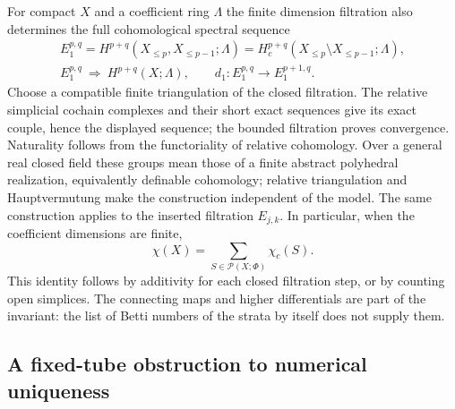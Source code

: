 For compact $X$ and a coefficient ring $\Lambda$ the finite dimension filtration
also determines the full cohomological spectral sequence
\[
 \begin{gathered}
 E_1^{p,q}=H^{p+q}(X_{\le p},X_{\le p-1};\Lambda)
 =H_c^{p+q}(X_{\le p}\setminus X_{\le p-1};\Lambda),\\
 E_1^{p,q}\ \Longrightarrow\ H^{p+q}(X;\Lambda),
 \qquad d_1:E_1^{p,q}\longrightarrow E_1^{p+1,q}.
 \end{gathered}
\]
Choose a compatible finite triangulation of the closed filtration.
The relative simplicial cochain complexes and their short exact
sequences give its exact couple, hence the displayed sequence;
the bounded filtration proves convergence. Naturality follows
from the functoriality of relative cohomology. Over a general real
closed field these groups mean those of a finite abstract
polyhedral realization, equivalently definable cohomology; relative
triangulation and Hauptvermutung make the construction independent
of the model. The same construction applies to the inserted
filtration $E_{j,k}$. In particular, when the coefficient dimensions
are finite,
\[
 \chi(X)=\sum_{S\in\mathcal P(X;\Phi)}\chi_c(S).
\]
This identity follows by additivity for each closed filtration
step, or by counting open simplices. The connecting maps and
higher differentials are part of the invariant: the list of Betti
numbers of the strata by itself does not supply them.

\subsection{A fixed-tube obstruction to numerical uniqueness}

